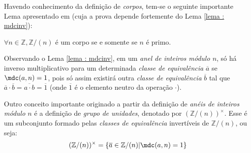 Havendo conhecimento da definição de \textit{corpos}, tem-se o seguinte importante Lema apresentado em \cite{book:2399854} (cuja a prova depende fortemente do Lema \ref{lema : mdcinv}):
    \begin{lema}
        $\forall n \in \mathbb{Z}, \mathbb{Z}/(n)$ é um corpo se e somente se $n$ é primo. 
    \end{lema}




Observando o Lema \ref{lema : mdcinv}, em um \textit{anel de inteiros módulo $n$}, só há inverso multiplicativo para um determinada \textit{classe de equivalência} $\overline{a}$ se $\mdc(a, n) = 1$, pois só assim existirá outra \textit{classe de equivalência} $\overline{b}$ tal que $\overline{a} \cdot \overline{b} = \overline{a \cdot b} = \overline{1}$ (onde $\overline{1}$ é o elemento neutro da operação $\cdot$).

Outro conceito importante originado a partir da definição de \textit{anéis de inteiros módulo $n$} é a definição de \textit{grupo de unidades}, denotado por $(\mathbb{Z}/(n))^{\times}$. Esse é um subconjunto formado pelas \textit{classes de equivalência} invertíveis de $\mathbb{Z}/(n)$, ou seja:
\begin{equation} \label{def:totientset}
    (\mathbb{Z}/(n))^{\times} = \{\overline{a} \in \mathbb{Z}/(n) | \mdc(a, n) = 1\}
\end{equation}

